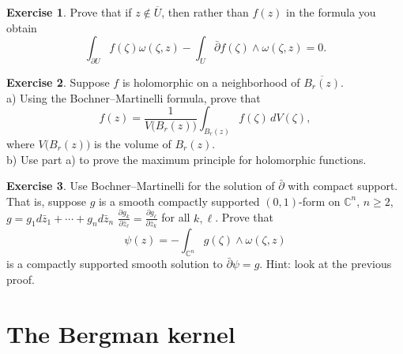 \documentclass[12pt,openany]{book}
\newcommand{\C}{{\mathbb{C}}}
\theoremstyle{plain}
\theoremstyle{remark}
\theoremstyle{definition}
\newenvironment{exbox}{%
    \def\FrameCommand{\vrule width 1pt \relax\hspace {10pt}}%
    \MakeFramed {\advance \hsize -\width \FrameRestore }%
}{%
    \endMakeFramed
}
\theoremstyle{exercise}
\newtheorem{exercise}{Exercise}[section]
\theoremstyle{example}
\begin{document}
\begin{exbox}
\begin{exercise}
Prove that if $z \notin \overline{U}$, then rather than $f(z)$ in the
formula you obtain
\begin{equation*}
\int_{\partial U}
f(\zeta) \omega(\zeta,z)
-
\int_{U}
\bar{\partial} f(\zeta) \wedge \omega(\zeta,z) = 0 .
\end{equation*}
\end{exercise}

\begin{exercise}
Suppose $f$ is holomorphic on a neighborhood of
$\overline{B_r(z)}$.\\
a) Using the Bochner--Martinelli formula, prove that
\begin{equation*}
f(z) = \frac{1}{V\bigl(B_r(z)\bigr)} \int_{B_r(z)} f(\zeta) \, dV(\zeta) ,
\end{equation*}
where $V\bigl(B_r(z)\bigr)$ is the volume of $B_r(z)$.\\
b) Use part a) to prove the maximum principle for holomorphic functions.
\end{exercise}

\begin{exercise}
Use Bochner--Martinelli for the solution of $\bar{\partial}$ with compact
support.  That is, suppose $g$ is a smooth compactly supported $(0,1)$-form
on $\C^n$, $n \geq 2$, $g = g_1 d\bar{z}_1 + \cdots + g_n d\bar{z}_n$
$\frac{\partial g_k}{\partial \bar{z}_\ell} =
\frac{\partial g_\ell}{\partial \bar{z}_k}$ for all $k, \ell$.
Prove that
\begin{equation*}
\psi(z) = - \int_{\C^n} g(\zeta) \wedge \omega(\zeta,z)
\end{equation*}
is a compactly supported smooth solution to $\bar{\partial} \psi = g$.
Hint: look at the previous proof.
\end{exercise}
\end{exbox}


\section{The Bergman kernel}
\end{document}
